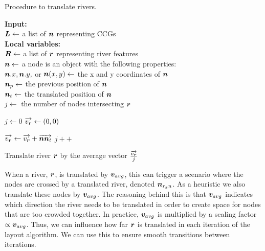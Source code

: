 \begin{algorithm}[tbh!]
    \caption{Procedure to translate rivers.}\label{alg:TranslateRiver}
    \textbf{Input:} \\
    $ \bm{L} \gets $ a list of $ \bm{n} $ representing CCGs \\

    \textbf{Local variables:} \\
    $ \bm{R} \gets $ a list of $ \bm{r} $ representing river features \\
    $ \bm{n} \gets $ a node is an object with the following properties: \\
    \-\hspace{1em} $ \bm{n}.x, \bm{n}.y, $ or $ \bm{n}(x,y) \gets $ the x and y coordinates of $ \bm{n} $ \\
    \-\hspace{1em} $ \bm{n}_{p} \gets $ the previous position of $ \bm{n} $ \\
    \-\hspace{1em} $ \bm{n}_t \gets $ the translated position of $ \bm{n} $ \\
    $ j \gets $ the number of nodes intersecting $ \bm{r} $  \\

    \begin{algorithmic}[1]
        \ForEach {$ \river \in \riverList $}
        \State $ j \gets 0 $
        \State $ \protect\overrightarrow{v_{\bm{r}}} \gets (0,0) $ 
        \ForEach {$ \node \in \nodeList $}

        \State $ \protect\overrightarrow{v_{\bm{r}}} \gets \protect\overrightarrow{v_{\bm{r}}} + \protect\overrightarrow{\bm{n}\bm{n}_t}$
        \State $ j ++ $
        \EndIf

        \EndIf

        \EndFor

        \State Translate river $ \bm{r} $ by the average vector $ \frac{\protect\overrightarrow{v_{\bm{r}}}}{j} $
        \EndFor

        \EndProcedure
    \end{algorithmic}
\end{algorithm}


When a river, $ \bm{r} $, is translated by $ \bm{v}_{avg} $, this can trigger a scenario where the nodes are crossed by a translated river, denoted $ \bm{n}_{r_{x}n} $. As a heuristic we also translate these nodes by $ \bm{v}_{avg} $. The reasoning behind this is that $ \bm{v}_{avg} $ indicates which direction the river needs to be translated in order to create space for nodes that are too crowded together. In practice, $ \bm{v}_{avg} $ is multiplied by a scaling factor $ \propto\bm{v}_{avg} $. Thus, we can influence how far $ \bm{r} $ is translated in each iteration of the layout algorithm. We can use this to ensure smooth transitions between iterations.

